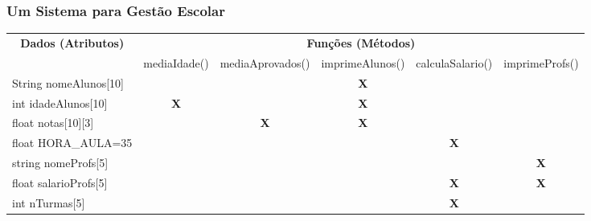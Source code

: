 \documentclass[aspectratio=169]{beamer}
\begin{document}
\begin{frame}\frametitle{Um Sistema para Gestão Escolar}

\begin{table}[]
\scriptsize{
\begin{tabular}{|l|l|l|l|l|l|}
\hline
\multicolumn{1}{|c|}{\multirow{2}{*}{\textbf{Dados (Atributos)}}} & \multicolumn{5}{c|}{\textbf{Funções (Métodos)}} \\ \cline{2-6} 
\multicolumn{1}{|c|}{} & mediaIdade() & mediaAprovados() & imprimeAlunos() & calculaSalario() & imprimeProfs() \\
\hline
String nomeAlunos{[}10{]} &  &  & \multicolumn{1}{c|}{\textbf{X}} &  &  \\
\hline
int idadeAlunos{[}10{]} & \multicolumn{1}{c|}{\textbf{X}} &  & \multicolumn{1}{c|}{\textbf{X}} &  &  \\
\hline
float notas{[}10{]}{[}3{]} &  & \multicolumn{1}{c|}{\textbf{X}} & \multicolumn{1}{c|}{\textbf{X}} &  &  \\
\hline
float HORA\_AULA=35 &  &  &  & \multicolumn{1}{c|}{\textbf{X}} &  \\
\hline
string nomeProfs{[}5{]} &  &  &  &  & \multicolumn{1}{c|}{\textbf{X}} \\
\hline
float salarioProfs{[}5{]} &  &  &  & \multicolumn{1}{c|}{\textbf{X}} & \multicolumn{1}{c|}{\textbf{X}} \\
\hline
int nTurmas{[}5{]} &  &  &  & \multicolumn{1}{c|}{\textbf{X}} &  \\
\hline
\end{tabular}
}
\end{table}
\end{frame}
\end{document}
